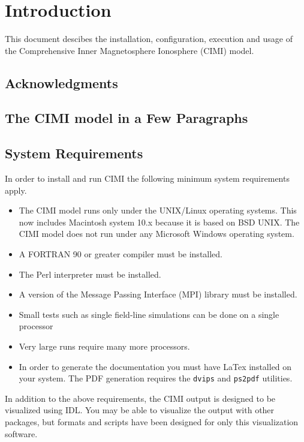 
\chapter{Introduction}

This document descibes the installation, configuration, execution and 
usage of the Comprehensive Inner Magnetosphere Ionosphere (CIMI) model.

\section{Acknowledgments}


\section{The CIMI model in a Few Paragraphs}


\section{System Requirements}

In order to install and run CIMI the following minimum system
requirements apply.

\begin{itemize}
\item The CIMI model runs only under the UNIX/Linux operating systems.  This now
  includes Macintosh system 10.x because it is based on BSD UNIX.  The
  CIMI model does not run under any Microsoft Windows operating system.
\item A FORTRAN 90 or greater compiler must be installed.
\item The Perl interpreter must be installed.
\item A version of the Message Passing Interface (MPI) library must be
  installed.
\item Small tests such as single  field-line simulations can be done on a 
  single processor
\item Very large runs require many more processors.
\item In order to generate the documentation you must have LaTex installed on
your system.  The PDF generation requires the {\tt dvips} and {\tt ps2pdf}
utilities. 

\end{itemize}


In addition to the above requirements, the CIMI output is designed to
be visualized using IDL.  You may be able to
visualize the output with other packages, but formats and scripts have
been designed for only this visualization software.



